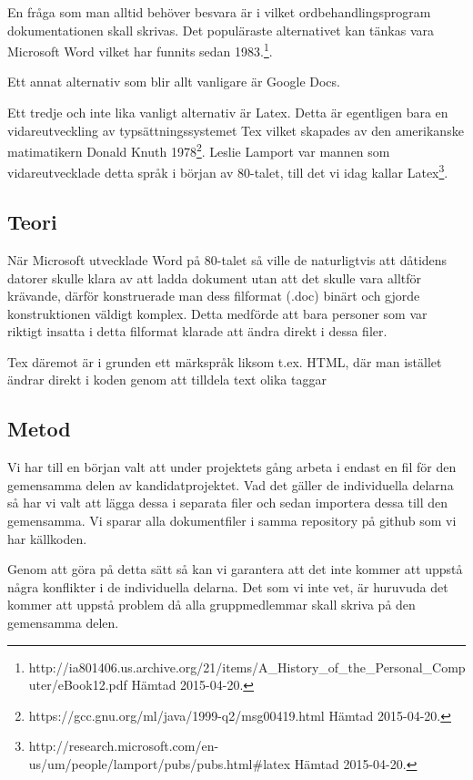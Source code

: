 En fråga som man alltid behöver besvara är i vilket ordbehandlingsprogram dokumentationen skall skrivas. Det populäraste 
alternativet kan tänkas vara Microsoft Word vilket har funnits sedan 1983.\footnote{http://ia801406.us.archive.org/21/items/A\_History\_of\_the\_Personal\_Computer/eBook12.pdf Hämtad 2015-04-20.}.

Ett annat alternativ som blir allt vanligare är Google Docs.

Ett tredje och inte lika vanligt alternativ är Latex. Detta är egentligen bara en vidareutveckling av typsättningssystemet 
Tex vilket skapades av den amerikanske matimatikern Donald Knuth 1978\footnote{https://gcc.gnu.org/ml/java/1999-q2/msg00419.html Hämtad 2015-04-20.}. Leslie Lamport var mannen som vidareutvecklade detta 
språk i början av 80-talet, till det vi idag kallar Latex\footnote{http://research.microsoft.com/en-us/um/people/lamport/pubs/pubs.html\#latex Hämtad 2015-04-20.}.




\subsection{Teori}
När Microsoft utvecklade Word på 80-talet så ville de naturligtvis att dåtidens datorer skulle klara av att ladda 
dokument utan att det skulle vara alltför krävande, därför konstruerade man dess filformat (.doc) binärt och gjorde konstruktionen 
väldigt komplex. Detta medförde att bara personer som var riktigt insatta i detta filformat klarade att ändra direkt i dessa filer.

Tex däremot är i grunden ett märkspråk liksom t.ex. HTML, där man istället ändrar direkt i koden genom att tilldela text olika taggar

\subsection{Metod}
Vi har till en början valt att under projektets gång arbeta i endast en fil för den gemensamma delen av kandidatprojektet. Vad det gäller 
de individuella delarna så har vi valt att lägga dessa i separata filer och sedan importera dessa till den gemensamma. Vi 
sparar alla dokumentfiler i samma repository på github som vi har källkoden.

Genom att göra på detta sätt så kan vi garantera att det inte kommer att uppstå några konflikter i de individuella delarna.
Det som vi inte vet, är huruvuda det kommer att uppstå problem då alla gruppmedlemmar skall skriva på den gemensamma delen.

